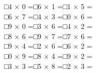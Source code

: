 \documentclass[uplatex,
paper=a4,
fontsize=18pt,
jafontsize=16pt,
number_of_lines=30,
line_length=30zh,
baselineskip=25pt,
]{jlreq}
\begin{document}
□\hspace{1em}4 × 0 =\hspace{3em}□\hspace{1em}6 × 1 =\hspace{3em}□\hspace{1em}1 × 5 =\hspace{3em}
\\

□\hspace{1em}6 × 7 =\hspace{3em}□\hspace{1em}4 × 3 =\hspace{3em}□\hspace{1em}0 × 6 =\hspace{3em}
\\

□\hspace{1em}9 × 0 =\hspace{3em}□\hspace{1em}3 × 6 =\hspace{3em}□\hspace{1em}4 × 2 =\hspace{3em}
\\

□\hspace{1em}8 × 6 =\hspace{3em}□\hspace{1em}9 × 7 =\hspace{3em}□\hspace{1em}7 × 6 =\hspace{3em}
\\

□\hspace{1em}9 × 4 =\hspace{3em}□\hspace{1em}2 × 6 =\hspace{3em}□\hspace{1em}6 × 2 =\hspace{3em}
\\

□\hspace{1em}0 × 9 =\hspace{3em}□\hspace{1em}8 × 4 =\hspace{3em}□\hspace{1em}9 × 2 =\hspace{3em}
\\

□\hspace{1em}3 × 3 =\hspace{3em}□\hspace{1em}5 × 8 =\hspace{3em}□\hspace{1em}2 × 3 =\hspace{3em}
\\
\end{document}
